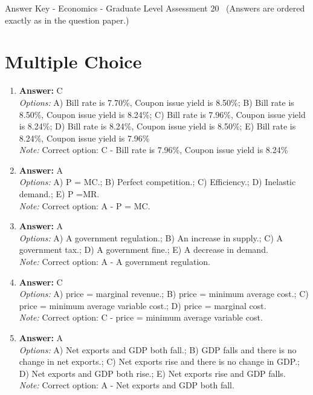 \documentclass[12pt]{article}
\begin{document}
\begin{center}
Answer Key - Economics - Graduate Level Assessment 20 \
\small (Answers are ordered exactly as in the question paper.)
\end{center}

\section*{Multiple Choice}
\begin{enumerate}[label=\arabic*.]
\item \textbf{Answer:} C
\\ \textit{Options:} A) Bill rate is 7.70\%, Coupon issue yield is 8.50\%; B) Bill rate is 8.50\%, Coupon issue yield is 8.24\%; C) Bill rate is 7.96\%, Coupon issue yield is 8.24\%; D) Bill rate is 8.24\%, Coupon issue yield is 8.50\%; E) Bill rate is 8.24\%, Coupon issue yield is 7.96\%
\\ \textit{Note:} Correct option: C - Bill rate is 7.96\%, Coupon issue yield is 8.24\%
\item \textbf{Answer:} A
\\ \textit{Options:} A) P = MC.; B) Perfect competition.; C) Efficiency.; D) Inelastic demand.; E) P =MR.
\\ \textit{Note:} Correct option: A - P = MC.
\item \textbf{Answer:} A
\\ \textit{Options:} A) A government regulation.; B) An increase in supply.; C) A government tax.; D) A government fine.; E) A decrease in demand.
\\ \textit{Note:} Correct option: A - A government regulation.
\item \textbf{Answer:} C
\\ \textit{Options:} A) price = marginal revenue.; B) price = minimum average cost.; C) price = minimum average variable cost.; D) price = marginal cost.
\\ \textit{Note:} Correct option: C - price = minimum average variable cost.
\item \textbf{Answer:} A
\\ \textit{Options:} A) Net exports and GDP both fall.; B) GDP falls and there is no change in net exports.; C) Net exports rise and there is no change in GDP.; D) Net exports and GDP both rise.; E) Net exports rise and GDP falls.
\\ \textit{Note:} Correct option: A - Net exports and GDP both fall.
\end{enumerate}
\end{document}
